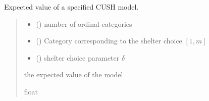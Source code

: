 \documentclass[letterpaper,10pt,english]{sphinxmanual}
\begin{document}
\begin{fulllineitems}
\label{\detokenize{cubmods:cubmods.cush.mean}}
\pysigstartsignatures
{}
\pysigstopsignatures
\sphinxAtStartPar
Expected value of a specified CUSH model.
\begin{quote}\begin{description}
\begin{itemize}
\item {} 
\sphinxAtStartPar
{} () \textendash{} number of ordinal categories

\item {} 
\sphinxAtStartPar
{} () \textendash{} Category corresponding to the shelter choice \([1,m]\)

\item {} 
\sphinxAtStartPar
{} () \textendash{} shelter choice parameter \(\delta\)

\end{itemize}

\sphinxAtStartPar
the expected value of the model

\sphinxAtStartPar
float

\end{description}\end{quote}

\end{fulllineitems}

\end{document}
